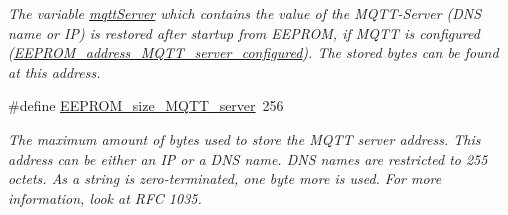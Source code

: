 \begin{DoxyCompactItemize}
\begin{DoxyCompactList}\small\item\em The variable \hyperlink{WIFIOnOff_8ino_a020889fcca6224d14f4d3f4241ca4467}{mqtt\-Server} which contains the value of the M\-Q\-T\-T-\/\-Server (D\-N\-S name or I\-P) is restored after startup from E\-E\-P\-R\-O\-M, if M\-Q\-T\-T is configured (\hyperlink{WIFIOnOff_8ino_a604b9f83bce537df8060d5bb69480c76}{E\-E\-P\-R\-O\-M\-\_\-address\-\_\-\-M\-Q\-T\-T\-\_\-server\-\_\-configured}). The stored bytes can be found at this address. \end{DoxyCompactList}\item 
\#define \hyperlink{WIFIOnOff_8ino_ac060eafb02eba00d33cad29f38819d4a}{E\-E\-P\-R\-O\-M\-\_\-size\-\_\-\-M\-Q\-T\-T\-\_\-server}~256
\begin{DoxyCompactList}\small\item\em The maximum amount of bytes used to store the M\-Q\-T\-T server address. This address can be either an I\-P or a D\-N\-S name. D\-N\-S names are restricted to 255 octets. As a string is zero-\/terminated, one byte more is used. For more information, look at R\-F\-C 1035. \end{DoxyCompactList}\end{DoxyCompactItemize}
